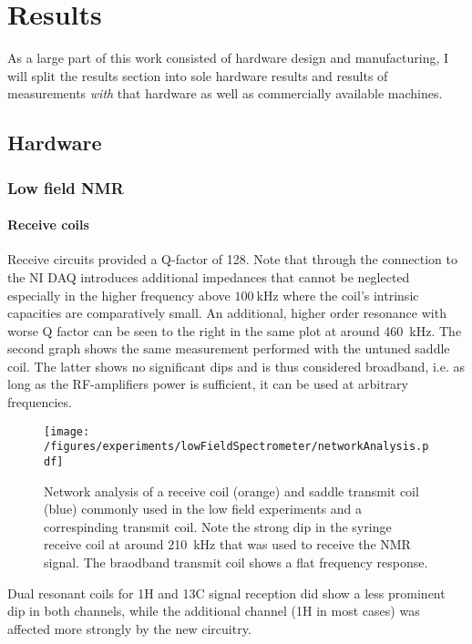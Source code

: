 \chapter{Results}\label{chap:results}
    As a large part of this work consisted of hardware design and manufacturing, I will split the results section into sole hardware results and results of measurements \textit{with} that hardware as well as commercially available machines.
\section{Hardware}
    \subsection{Low field NMR}
        \subsubsection{Receive coils}
        Receive circuits provided a Q-factor of \SI{128}{}. Note that through the connection to the NI DAQ introduces additional impedances that cannot be neglected especially in the higher frequency above $\SI{100}{\kilo\hertz}$ where the coil's intrinsic capacities are comparatively small. An additional, higher order resonance with worse Q factor can be seen to the right in the same plot at around \SI{460}{\kilo Hz}. The second graph shows the same measurement performed with the untuned saddle coil. The latter shows no significant dips and is thus considered broadband, i.e. as long as the RF-amplifiers power is sufficient, it can be used at arbitrary frequencies.
        \begin{figure}
            \label{fig:results:networkAnalysis}
            \texttt{[image: /figures/experiments/lowFieldSpectrometer/networkAnalysis.pdf]}
            \caption{Network analysis of a receive coil (orange) and saddle transmit coil (blue) commonly used in the low field experiments and a correspinding transmit coil. Note the strong dip in the syringe receive coil at around \SI{210}{\kilo\hertz} that was used to receive the NMR signal. The braodband transmit coil shows a flat frequency response.}
        \end{figure}
        Dual resonant coils for 1H and 13C signal reception did show a less prominent dip in both channels, while the additional channel (1H in most cases)  was affected more strongly by the new circuitry.
